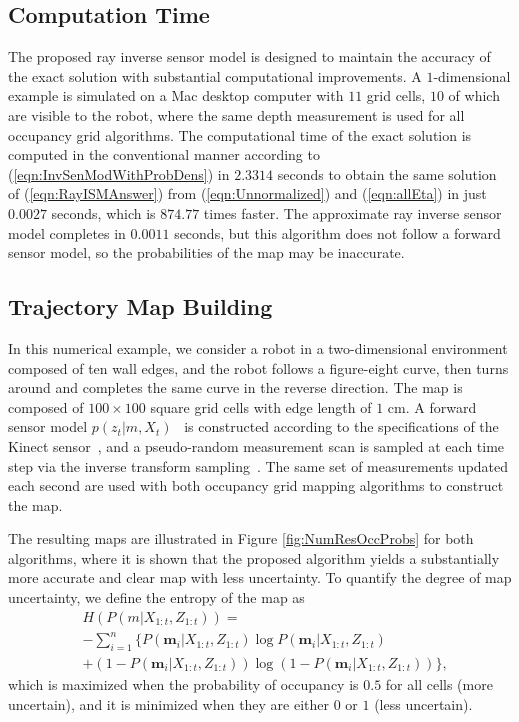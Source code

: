 \documentclass[letterpaper, 10pt, conference]{ieeeconf}
\newcommand{\refeqn}[1]{(\ref{eqn:#1})}
\begin{document}
\subsection{Computation Time}
The proposed ray inverse sensor model is designed to maintain the accuracy of the exact solution with substantial computational improvements.
A $1$-dimensional example is simulated on a Mac desktop computer with $11$ grid cells, $10$ of which are visible to the robot, where the same depth measurement is used for all occupancy grid algorithms.
The computational time of the exact solution is computed in the conventional manner according to \refeqn{InvSenModWithProbDens} in $2.3314$ seconds to obtain the same solution of \refeqn{RayISMAnswer} from \refeqn{Unnormalized} and \refeqn{allEta} in just $0.0027$ seconds, which is $874.77$ times faster.
The approximate ray inverse sensor model completes in $0.0011$ seconds, but this algorithm does not follow a forward sensor model, so the probabilities of the map may be inaccurate.








\subsection{Trajectory Map Building}
In this numerical example, we consider a robot in a two-dimensional environment composed of ten wall edges, and the robot follows a figure-eight curve, then turns around and completes the same curve in the reverse direction.
The map is composed of $100\times100$ square grid cells with edge length of $1$ cm.
A forward sensor model $p(z_t|m,X_t)$~\cite{ThrBurFox05} is constructed according to the specifications of the Kinect sensor~\cite{KhoElb12}, and a pseudo-random measurement scan is sampled at each time step via the inverse transform sampling~\cite{DevBK86}. The same set of measurements updated each second are used with both occupancy grid mapping algorithms to construct the map.

The resulting maps are illustrated in Figure \ref{fig:NumResOccProbs} for both algorithms, where it is shown that the proposed algorithm yields a substantially more accurate and clear map with less uncertainty. To quantify the degree of map uncertainty, we define the entropy of the map as 
\begin{align*}
&H(P(m|X_{1:t},Z_{1:t}))=\nonumber\\
&-\sum_{i=1}^n\big\{P(\mathbf{m}_i|X_{1:t},Z_{1:t})\log P(\mathbf{m}_i|X_{1:t},Z_{1:t})\nonumber\\
&+(1-P(\mathbf{m}_i|X_{1:t},Z_{1:t}))\log(1-P(\mathbf{m}_i|X_{1:t},Z_{1:t}))\big\},
\end{align*}
which is maximized when the probability of occupancy is $0.5$ for all cells (more uncertain), and it is minimized when they are either $0$ or $1$ (less uncertain). 
\end{document}
